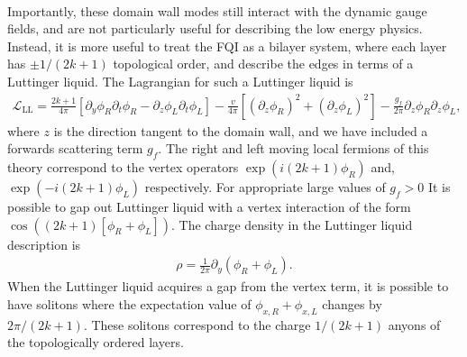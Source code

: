 \documentclass[%
 reprint,
 amsmath,amssymb,
 aps,
]{revtex4-1}
\begin{document}
\begin{appendix}
\begin{equation}
\begin{split}
\label{Aeq:DWFermionsY2Frac}\end{split}\end{equation}
Importantly, these domain wall modes still interact with the dynamic gauge fields, and are not particularly useful for describing the low energy physics. Instead, it is more useful to treat the FQI  as a bilayer system, where each layer has $\pm 1/(2k+1)$ topological order, and describe the edges in terms of a Luttinger liquid\cite{fradkin2013field}. The Lagrangian for such a Luttinger liquid is
\begin{equation}\begin{split}
\mathcal{L}_{\text{LL}} = \frac{2k+1}{4\pi} [\partial_y \phi_{R} \partial_t \phi_{R} - \partial_z \phi_{L} \partial_t \phi_{L}] - \frac{v}{4\pi}[(\partial_z \phi_{R})^2 + (\partial_z \phi_{L})^2] - \frac{g_f}{2\pi}\partial_z \phi_{R} \partial_z \phi_{L},
\label{Aeq:DWLLX}\end{split}\end{equation}
where $z$ is the direction tangent to the domain wall, and we have included a forwards scattering term $g_f$. The right and left moving local fermions of this theory correspond to the vertex operators $\exp(i (2k+1)\phi_{R})$ and, $\exp(-i (2k+1)\phi_{L})$ respectively. For appropriate large values of $g_f>0$ It is possible to gap out Luttinger liquid with a vertex interaction of the form $\cos((2k+1)[\phi_{R}+\phi_{L}])$. The charge density in the Luttinger liquid description is
\begin{equation}\begin{split}
\rho = \frac{1}{2\pi} \partial_y(\phi_{R}+\phi_{L}).
\label{Aeq:LLChargeX}\end{split}\end{equation}
When the Luttinger liquid acquires a gap from the vertex term, it is possible to have solitons where the expectation value of $\phi_{x,R}+\phi_{x,L}$ changes by $2\pi/(2k+1)$. These solitons correspond to the charge $1/(2k+1)$ anyons of the topologically ordered layers. 




\end{appendix}
\end{document}
